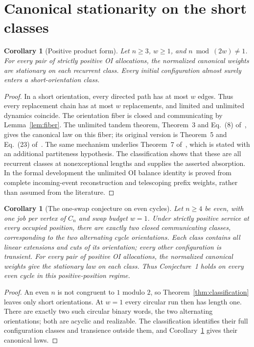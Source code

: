 \documentclass[11pt]{article}
\newtheorem{corollary}[theorem]{Corollary}
\theoremstyle{remark}
\begin{document}
\section{Canonical stationarity on the short classes}\label{sec:positive}
\begin{corollary}[Positive product form]\label{cor:positive}
Let $n\ge3$, $w\ge1$, and $n\bmod(2w)\ne1$. For every pair of strictly positive OI allocations, the normalized canonical weights are stationary on each recurrent class. Every initial configuration almost surely enters a short-orientation class.
\end{corollary}
\begin{proof}
In a short orientation, every directed path has at most $w$ edges. Thus every replacement chain has at most $w$ replacements, and limited and unlimited dynamics coincide. The orientation fiber is closed and communicating by Lemma~\ref{lem:fiber}. The unlimited tandem theorem, Theorem~3 and Eq.~(8) of~\cite[p.~217]{DG}, gives the canonical law on this fiber; its original version is Theorem~5 and Eq.~(23) of~\cite[p.~298]{CD}. The same mechanism underlies Theorem~7 of~\cite[p.~240]{DG}, which is stated with an additional partiteness hypothesis. The classification shows that these are all recurrent classes at nonexceptional lengths and supplies the asserted absorption. In the formal development the unlimited OI balance identity is proved from complete incoming-event reconstruction and telescoping prefix weights, rather than assumed from the literature.
\end{proof}

\begin{corollary}[The one-swap conjecture on even cycles]\label{cor:even-one}
Let $n\ge4$ be even, with one job per vertex of $C_n$ and swap budget $w=1$. Under strictly positive service at every occupied position, there are exactly two closed communicating classes, corresponding to the two alternating cycle orientations. Each class contains all linear extensions and cuts of its orientation; every other configuration is transient. For every pair of positive OI allocations, the normalized canonical weights give the stationary law on each class. Thus Conjecture~1 holds on every even cycle in this positive-position regime.
\end{corollary}
\begin{proof}
An even $n$ is not congruent to $1$ modulo $2$, so Theorem~\ref{thm:classification} leaves only short orientations. At $w=1$ every circular run then has length one. There are exactly two such circular binary words, the two alternating orientations; both are acyclic and realizable. The classification identifies their full configuration classes and transience outside them, and Corollary~\ref{cor:positive} gives their canonical laws.
\end{proof}
\end{document}
